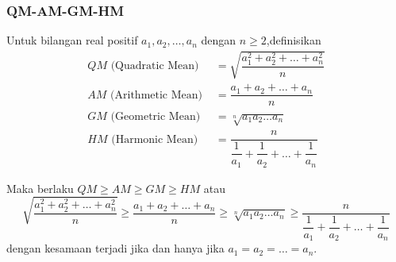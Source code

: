 \subsubsection{QM-AM-GM-HM}
Untuk bilangan real positif $a_1,a_2,\dots,a_n$ dengan $n\ge 2$,definisikan
\begin{align*}
    QM \text{ (Quadratic Mean) } &= \sqrt{\dfrac{a_1^2+a_2^2+\dots+a_n^2}{n}}\\
    AM \text{ (Arithmetic Mean) } &= \dfrac{a_1+a_2+\dots+a_n}{n}\\
    GM \text{ (Geometric Mean) } &=
    \sqrt[n]{a_1a_2\dots a_n}\\
    HM \text{ (Harmonic Mean) } &=
    \dfrac{n}{\dfrac{1}{a_1}+\dfrac{1}{a_2}+\dots+\dfrac{1}{a_n}}
\end{align*}

Maka berlaku $QM \ge AM \ge GM \ge HM$ atau 
$$\sqrt{\dfrac{a_1^2+a_2^2+\dots+a_n^2}{n}} \ge  \dfrac{a_1+a_2+\dots+a_n}{n}\ge
    \sqrt[n]{a_1a_2\dots a_n} \ge
    \dfrac{n}{\dfrac{1}{a_1}+\dfrac{1}{a_2}+\dots+\dfrac{1}{a_n}}$$
dengan kesamaan terjadi jika dan hanya jika $a_1=a_2=\dots =a_n$.